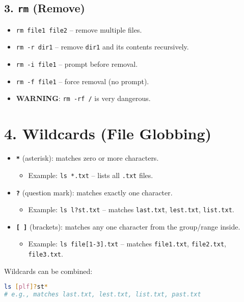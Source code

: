 \documentclass[a4paper]{report}
\begin{document}
\subsection*{3. \texttt{rm} (Remove)}
\begin{itemize}
    \item \texttt{rm file1 file2} -- remove multiple files.
    \item \texttt{rm -r dir1} -- remove \texttt{dir1} and its contents recursively.
    \item \texttt{rm -i file1} -- prompt before removal.
    \item \texttt{rm -f file1} -- force removal (no prompt).
    \item \textbf{WARNING}: \texttt{rm -rf /} is very dangerous.
\end{itemize}

\section*{4. Wildcards (File Globbing)}
\begin{itemize}
    \item \textbf{\texttt{*}} (asterisk): matches zero or more characters.
    \begin{itemize}
        \item Example: \texttt{ls *.txt} -- lists all \texttt{.txt} files.
    \end{itemize}
    \item \textbf{\texttt{?}} (question mark): matches exactly one character.
    \begin{itemize}
        \item Example: \texttt{ls l?st.txt} -- matches \texttt{last.txt}, \texttt{lest.txt}, \texttt{list.txt}.
    \end{itemize}
    \item \textbf{\texttt{[ ]}} (brackets): matches any one character from the group/range inside.
    \begin{itemize}
        \item Example: \texttt{ls file[1-3].txt} -- matches \texttt{file1.txt}, \texttt{file2.txt}, \texttt{file3.txt}.
    \end{itemize}
\end{itemize}
Wildcards can be combined:

\begin{lstlisting}[language=bash]
ls [plf]?st*
# e.g., matches last.txt, lest.txt, list.txt, past.txt
\end{lstlisting}
\end{document}
